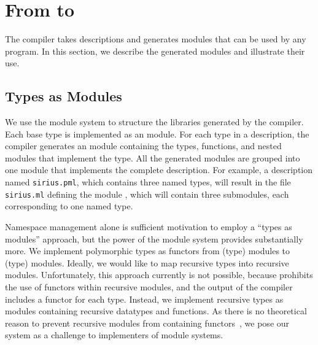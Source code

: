 \documentclass{sigplanconf}
\begin{document}



%
\section{From \padsmlbig{} to \ocamlbig{}}
\label{sec:padsml-impl}
The \padsml{} compiler takes descriptions and generates \ocaml{}
modules that can be used by any \ocaml{} program.  In this section, we
describe the generated modules and illustrate their use.

\subsection{Types as Modules}
\label{sec:gen-code}

We use the \ocaml{} module system to structure the libraries generated
by the \padsml{} compiler.  Each \padsml{} base type is implemented as
an \ocaml{} module.  For each \padsml{} type in a description, the
\padsml{} compiler generates an \ocaml{} module containing the types,
functions, and nested modules that implement the \padsml{} type.  All
the generated modules are grouped into one module that implements the
complete description.  For example, a \padsml{} description named
\texttt{sirius.pml}, which contains three named types, will result in the
\ocaml{} file \texttt{sirius.ml} defining the module ,
which will contain three submodules, each corresponding to one named type.

Namespace management alone is sufficient motivation to employ a
``types as modules'' approach, but the power of the \ml{} module
system provides substantially more.  We implement polymorphic
\padsml{} types as functors from (type) modules to (type) modules.
Ideally, we would like to map recursive \padsml{} types into recursive
modules.  Unfortunately, this approach currently is not possible, because
\ocaml{} prohibits the use of functors within recursive modules,
and the output of the \padsml{} compiler includes a functor for each
type.  Instead, we implement recursive types as modules containing
recursive datatypes and functions.  As there is no theoretical reason
to prevent recursive modules from containing functors~\cite{dreyer-thesis}, we
pose our system as a challenge to implementers of module systems.
\end{document}
